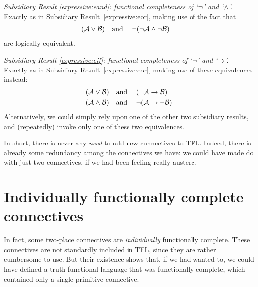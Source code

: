 \emph{Subsidiary Result \ref{expressive:eand}: functional completeness of `$\neg$' and `$\wedge$'.} Exactly as in Subsidiary Result~\ref{expressive:eor}, making use of the fact that
		\begin{align*}
		(\mathcal{A} \vee \mathcal{B}) & \text{\quad and \quad}\neg(\neg \mathcal{A} \wedge\neg \mathcal{B})
		\end{align*}
are logically equivalent.

\emph{Subsidiary Result \ref{expressive:eif}: functional completeness of `$\neg$' and `$\rightarrow$'.} Exactly as in Subsidiary Result~\ref{expressive:eor}, making use of these equivalences instead:
		\begin{align*}
		(\mathcal{A} \vee \mathcal{B}) &\text{\quad and \quad} (\neg \mathcal{A} \rightarrow \mathcal{B})\\
		(\mathcal{A} \wedge \mathcal{B}) &\text{\quad and \quad} \neg(\mathcal{A} \rightarrow \neg\mathcal{B})
		\end{align*}
Alternatively, we could simply rely upon one of the other two subsidiary results, and (repeatedly) invoke only one of these two equivalences.

In short, there is never any \emph{need} to add new connectives to TFL. Indeed, there is already some redundancy among the connectives we have: we could have made do with just two connectives, if we had been feeling really austere.

\section[Individually functionally complete connectives][Functionally complete connectives]{Individually functionally complete connectives}

In fact, some two-place connectives are \emph{individually} functionally complete. These connectives are not standardly included in TFL, since they are rather cumbersome to use. But their existence shows that, if we had wanted to, we could have defined a truth-functional language that was functionally complete, which contained only a single primitive connective.

